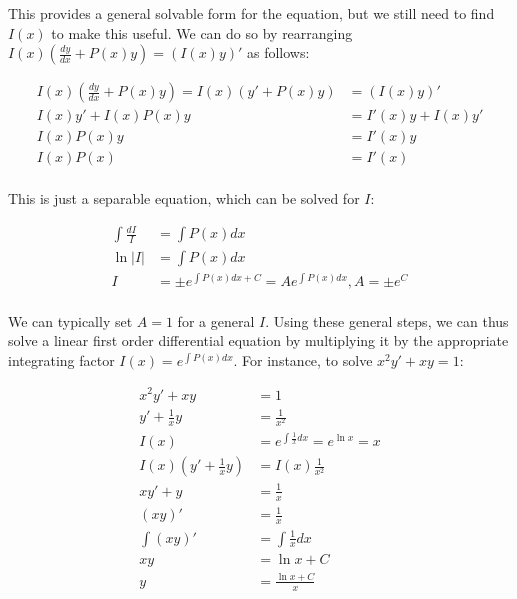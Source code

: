 \documentclass[12pt]{article}
\begin{document}
This provides a general solvable form for the equation, but we still need to find $I(x)$ to make this useful. We can do so by rearranging $I(x)(\frac{dy}{dx} + P(x)y) = (I(x)y)'$ as follows:

\begin{equation}
    \begin{split}
    I(x)(\frac{dy}{dx} + P(x)y) = I(x)(y'+P(x)y) &= (I(x)y)'\\
    I(x)y' + I(x)P(x)y &= I'(x)y+I(x)y'\\
    I(x)P(x)y &= I'(x)y\\
    I(x)P(x) &= I'(x)\\
    \end{split}
\end{equation}

This is just a separable equation, which can be solved for $I$:

\begin{equation}
    \begin{split}
        \int \frac{dI}{I} &= \int P(x) dx\\
        \ln |I| &= \int P(x) dx \\
        I  &= \pm e^{\int P(x) dx + C} = Ae^{\int P(x) dx}, A=\pm e^{C}\\
    \end{split}
\end{equation}

We can typically set $A=1$ for a general $I$. Using these general steps, we can thus solve a linear first order differential equation by multiplying it by the appropriate integrating factor $I(x) = e^{\int P(x) dx}$. For instance, to solve $x^2y'+xy=1$:

\begin{equation}
    \begin{split}
        x^2y'+xy &= 1\\
        y' + \frac{1}{x}y &= \frac{1}{x^2}\\
        I(x) &= e^{\int \frac{1}{x} dx} = e^{\ln x} = x\\
        I(x)(y' + \frac{1}{x}y) &= I(x)\frac{1}{x^2}\\
        xy'+y &= \frac{1}{x}\\
        (xy)' &= \frac{1}{x}\\
        \int (xy)' &= \int \frac{1}{x} dx\\
        xy &= \ln x + C\\
        y &= \frac{\ln x + C}{x}\\
    \end{split}
\end{equation}
\end{document}
